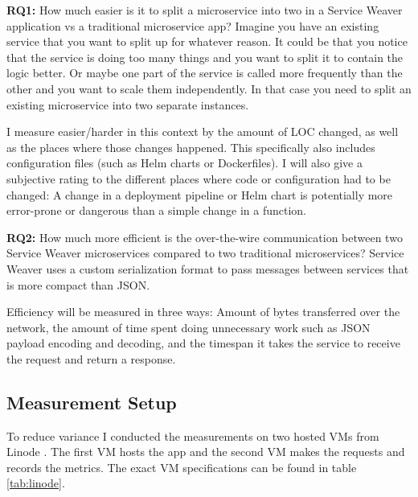 \documentclass[sigconf,review,9pt]{acmart}
\begin{document}
\textbf{RQ1:} How much easier is it to split a microservice into two in a Service Weaver
application vs a traditional microservice app?
Imagine you have an existing service that you want to split up for whatever
reason.
It could be that you notice that the service is doing too many things
and you want to split it to contain the logic better.
Or maybe one part of the service is called more frequently than the other
and you want to scale them independently.
In that case you need to split an existing microservice into two separate
instances.

I measure easier/harder in this context by the amount of LOC changed, as well
as the places where those changes happened.
This specifically also includes configuration files (such as Helm charts or Dockerfiles).
I will also give a subjective rating to the different places where code
or configuration had to be changed: A change in a deployment pipeline
or Helm chart is potentially more error-prone or dangerous than a simple
change in a function.

\textbf{RQ2:} How much more efficient is the over-the-wire communication between two Service Weaver
microservices compared to two traditional microservices?
Service Weaver uses a custom serialization format to pass messages between services
that is more compact than JSON.

Efficiency will be measured in three ways: Amount of bytes transferred over
the network, the amount of time spent doing unnecessary work such as
JSON payload encoding and decoding, and the timespan it takes the
service to receive the request and return a response.

\subsection{Measurement Setup}

To reduce variance I conducted the measurements on two hosted VMs from Linode \cite{Linode}.
The first VM hosts the app and the second VM makes the requests and records the
metrics.
The exact VM specifications can be found in table \ref{tab:linode}.
\end{document}

